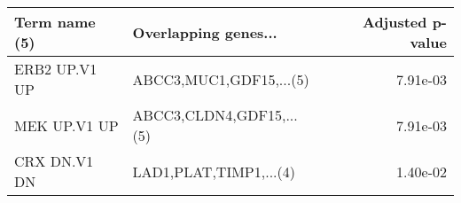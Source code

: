 \begin{tabular}{llr}
\toprule
Term name (5) &     Overlapping genes... &  Adjusted p-value \\
\midrule
ERB2 UP.V1 UP &  ABCC3,MUC1,GDF15,...(5) &          7.91e-03 \\
 MEK UP.V1 UP & ABCC3,CLDN4,GDF15,...(5) &          7.91e-03 \\
 CRX DN.V1 DN &   LAD1,PLAT,TIMP1,...(4) &          1.40e-02 \\
\bottomrule
\end{tabular}
